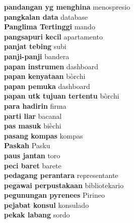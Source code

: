 \textbf{ pandangan yg menghina  } menospresio \\
\textbf{ pangkalan data  } database \\
\textbf{ Panglima Tertinggi  } mando \\
\textbf{ pangsapuri kecil  } apartamento \\
\textbf{ panjat tebing  } subi \\
\textbf{ panji-panji  } bandera \\
\textbf{ papan instrumen  } dashboard \\
\textbf{ papan kenyataan  } bòrchi \\
\textbf{ papan pemuka  } dashboard \\
\textbf{ papan utk tujuan tertentu  } bòrchi \\
\textbf{ para hadirin  } firma \\
\textbf{ parti liar  } bacanal \\
\textbf{ pas masuk  } bièchi \\
\textbf{ pasang kompas  } kompas \\
\textbf{ Paskah  } Pasku \\
\textbf{ paus jantan  } toro \\
\textbf{ peci baret  } barete \\
\textbf{ pedagang perantara  } representante \\
\textbf{ pegawai perpustakaan  } bibliotekario \\
\textbf{ pegunungan pyrenees  } Pirineo \\
\textbf{ pejabat konsul  } konsulado \\
\textbf{ pekak labang  } sordo \\
